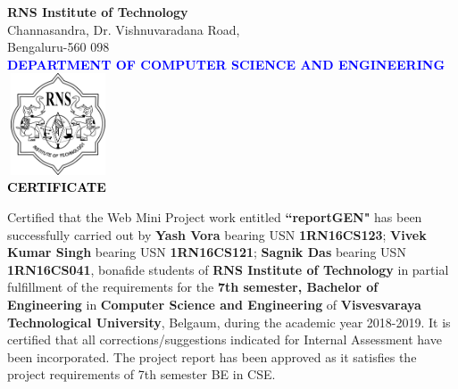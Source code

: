 \thispagestyle{empty}
\begin{center}

\textup{\large {\textcolor{darkbrown}{\bf RNS Institute of Technology}} \\ 
\normalsize{\textcolor{darkbrown}{Channasandra, Dr. Vishnuvaradana Road,\\ Bengaluru-560 098}}}\\[0.1in]
\textup{\normalsize {\textcolor{blue}{\bf DEPARTMENT OF COMPUTER SCIENCE AND ENGINEERING}}}\\[0.1in]
\includegraphics[width=3cm, height=3cm]{../static/media/RNS_logo.png}\\[0.1in]
\textup{\large {\textcolor{black}{\textbf {CERTIFICATE}}}} \\[0.1in]
\end{center}

\begin{minipage}{14.8cm}
Certified that the Web Mini Project work entitled \textbf{``reportGEN"} has been successfully carried out by \textbf{Yash Vora} bearing USN \textbf{1RN16CS123};  \textbf{Vivek Kumar Singh} bearing USN \textbf{1RN16CS121};  \textbf{Sagnik Das} bearing USN \textbf{1RN16CS041}, bonafide students of \textbf{RNS Institute of Technology} in partial fulfillment of the requirements for the \textbf{7th semester, Bachelor of Engineering} in \textbf{Computer Science and Engineering} of \textbf{Visvesvaraya Technological University}, Belgaum, during the academic year 2018-2019. It is certified that all corrections/suggestions indicated for Internal Assessment have been incorporated. The project report has been approved as it satisfies the project requirements of 7th semester BE in CSE.\\[0.4in]
\end{minipage}

